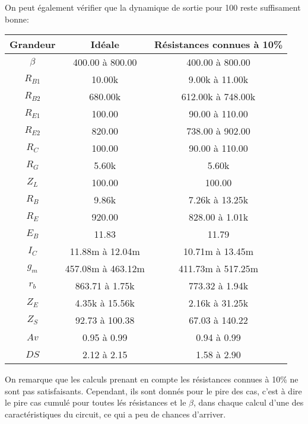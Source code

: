   On peut également vérifier que la dynamique de sortie pour 100\ohm{}
   reste suffisament bonne:


   \begin{tabular}{|c|c|c|}
    \hline
    Grandeur  & Idéale           &   Résistances connues à 10\% \\\hline
    $\beta$   & 400.00 à 800.00  & 400.00 à 800.00 \\\hline
    $R_{B1}$  &      10.00k      & 9.00k à 11.00k  \\\hline
    $R_{B2}$  &     680.00k      &612.00k à 748.00k\\\hline
    $R_{E1}$  &      100.00      & 90.00 à 110.00  \\\hline
    $R_{E2}$  &      820.00      & 738.00 à 902.00 \\\hline
    $R_C$     &      100.00      & 90.00 à 110.00  \\\hline
    $R_G$     &      5.60k       &      5.60k       \\\hline
    $Z_L$     &      100.00      &      100.00      \\\hline
    $R_B$     &      9.86k       & 7.26k à 13.25k  \\\hline
    $R_E$     &      920.00      & 828.00 à 1.01k  \\\hline
    $E_B$     &      11.83       &      11.79       \\\hline
    $I_C$     & 11.88m à 12.04m  & 10.71m à 13.45m \\\hline
    $g_m$     &457.08m à 463.12m &411.73m à 517.25m\\\hline
    $r_b$     & 863.71 à 1.75k   & 773.32 à 1.94k  \\\hline
    $Z_E$     & 4.35k à 15.56k   & 2.16k à 31.25k  \\\hline
    $Z_S$     & 92.73 à 100.38   & 67.03 à 140.22  \\\hline
    $Av$      &   0.95 à 0.99    &   0.94 à 0.99   \\\hline
    $DS$      &   2.12 à 2.15    &   1.58 à 2.90\\\hline
   \end{tabular}


   On remarque que les calculs prenant en compte les résistances connues à 10\% 
   ne sont pas satisfaisants. Cependant, ils sont donnés pour le pire des cas,
   c’est à dire le pire cas cumulé pour toutes lés résistances et le $\beta$, dans chaque calcul
   d’une des caractéristiques du circuit, ce qui a peu de chances d’arriver.
    
